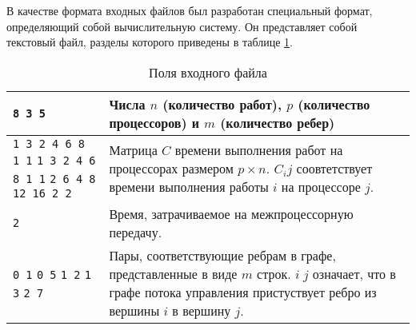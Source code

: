 В качестве формата входных файлов был разработан специальный формат, определяющий собой вычислительную систему. Он представляет собой текстовый файл, разделы которого приведены в таблице \ref{tbl:input-file-fields}.

\begin{table}
    \centering
    \begin{tabularx}{\textwidth}{|X|X|}
        \hline
        \texttt{8 3 5}                                                                                       & Числа $n$ (количество работ), $p$ (количество процессоров) и $m$ (количество ребер)                                                              \\
        \hline
        \texttt{1 3 2 4 6 8 1 1} \newline \texttt{1 3 2 4 6 8 1 1} \newline \texttt{2 6 4 8 12 16 2 2}       & Матрица $C$ времени выполнения работ на процессорах размером $p \times n$. $C_ij$ соовтетствует времени выполнения работы $i$ на процессоре $j$. \\
        \hline
        \texttt{2}                                                                                           & Время, затрачиваемое на межпроцессорную передачу.                                                                                                \\
        \hline
        \texttt{0 1} \newline \texttt{0 5} \newline \texttt{1 2} \newline \texttt{1 3} \newline \texttt{2 7} & Пары, соответствующие ребрам в графе, представленные в виде $m$ строк. $i\;j$ означает, что в графе потока управления пристуствует ребро из вершины $i$ в вершину $j$.                                                                                                                                            \\
        \hline
    \end{tabularx}
    \caption{Поля входного файла}
    \label{tbl:input-file-fields}
\end{table}

